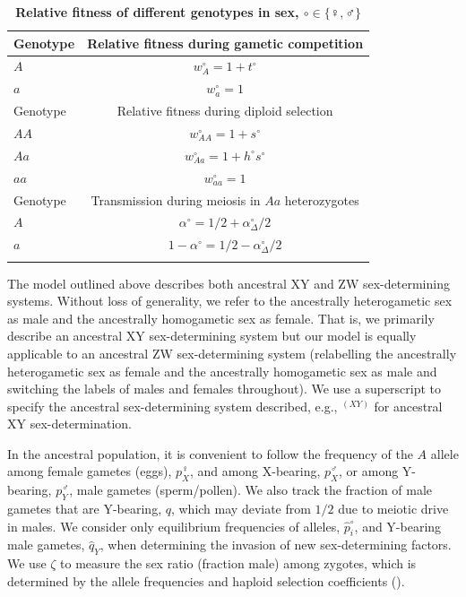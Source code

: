 \documentclass[10pt,letterpaper]{article}
\begin{document}
\begin{table}[ht]
\smallskip
\caption{{\bf Relative fitness of different genotypes in sex, $\circ \in \{\female,\male\}$ } }
\begin{tabular}{l c }
\hline\hline
  Genotype & Relative fitness during gametic competition \\ [0.5ex] \hline
  $A$ & $w_{A}^\circ = 1+t^\circ$ \\
  $a$ & $w_{a}^\circ = 1$ \\ [0.5ex] \hline
  Genotype & Relative fitness during diploid selection \\ [0.5ex] \hline
  $AA$ & $w_{AA}^\circ = 1+ s^\circ$ \\
  $Aa$ & $w_{Aa}^\circ = 1+h^\circ s^\circ$ \\
  $aa$ & $w_{aa}^\circ = 1$ \\ [0.5ex] \hline
  Genotype & Transmission during meiosis in $Aa$ heterozygotes \\ [0.5ex] \hline
  $A$ & $\alpha^\circ=1/2+\alpha_{\Delta}^{\circ}/2$ \\
  $a$ & $1-\alpha^\circ=1/2-\alpha_{\Delta}^{\circ}/2$ \\
  \hline \hline
  \label{tab:fitnesstable}
 \end{tabular}
\end{table}

The model outlined above describes both ancestral XY and ZW sex-determining systems. 
Without loss of generality, we refer to the ancestrally heterogametic sex as male and the ancestrally homogametic sex as female.
That is, we primarily describe an ancestral XY sex-determining system but our model is equally applicable to an ancestral ZW sex-determining system (relabelling the ancestrally heterogametic sex as female and the ancestrally homogametic sex as male and switching the labels of males and females throughout). 
We use a superscript to specify the ancestral sex-determining system described, e.g., $^{(XY)}$ for ancestral XY sex-determination.

In the ancestral population, it is convenient to follow the frequency of the $A$ allele among female gametes (eggs), $p^\female_X$, and among X-bearing, $p^\male_X$, or among Y-bearing, $p^\male_Y$, male gametes (sperm/pollen). 
We also track the fraction of male gametes that are Y-bearing, $q$, which may deviate from $1/2$ due to meiotic drive in males. 
We consider only equilibrium frequencies of alleles, $\hat{p}^\circ_i$, and Y-bearing male gametes, $\hat{q}_{Y}$, when determining the invasion of new sex-determining factors.
We use $\zeta$ to measure the sex ratio (fraction male) among zygotes, which is determined by the allele frequencies and haploid selection coefficients ().
\end{document}
